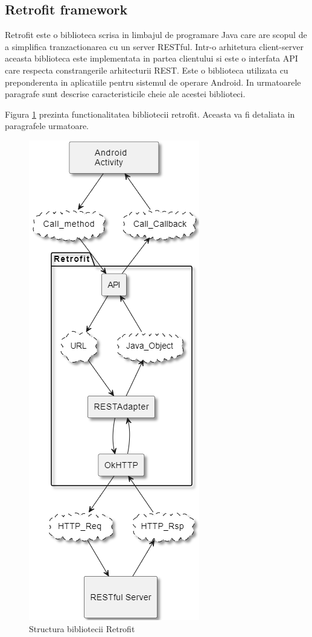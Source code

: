 \subsection{Retrofit framework}\label{sec:retrofit}
Retrofit este o biblioteca scrisa in limbajul de programare Java care are scopul de a simplifica tranzactionarea cu un server RESTful. Intr-o arhitetura 
client-server aceasta biblioteca este implementata in partea clientului si este o interfata API care respecta constrangerile arhitecturii REST. Este o 
biblioteca utilizata cu preponderenta in aplicatiile pentru sistemul de operare Android. In urmatoarele paragrafe sunt descrise caracteristicile cheie 
ale acestei biblioteci.

Figura \ref{fig:RetrofitStructure} prezinta functionalitatea bibliotecii retrofit. Aceasta va fi detaliata in paragrafele urmatoare.
\begin{figure}[H]
    \centering
    \includegraphics[scale=0.55]{figs/RetrofitStructure.png}
    \caption{Structura bibliotecii Retrofit}
    \label{fig:RetrofitStructure}
\end{figure}


